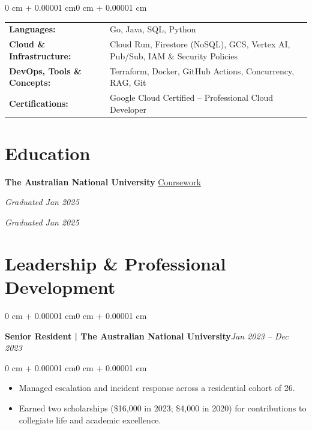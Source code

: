 \documentclass[10pt, letterpaper]{article}
\newenvironment{highlights}{
    \begin{itemize}[
        topsep=0.10 cm,
        parsep=0.10 cm,
        partopsep=0pt,
        itemsep=0pt,
        leftmargin=0 cm + 10pt
    ]
}{
    \end{itemize}
}
\newenvironment{onecolentry}{
    \begin{adjustwidth}{0 cm + 0.00001 cm}{0 cm + 0.00001 cm}
}{
    \end{adjustwidth}
}
\let\hrefWithoutArrow\href
\begin{document}
\begin{onecolentry}
    \begin{tabularx}{\linewidth}{@{} l X @{}}
        \textbf{Languages:}           & Go, Java, SQL, Python \\[0.2cm]
        \textbf{Cloud \& Infrastructure:} & Cloud Run, Firestore (NoSQL), GCS, Vertex AI, Pub/Sub, IAM \& Security Policies \\[0.2cm]
        \textbf{DevOps, Tools \& Concepts:}     & Terraform, Docker, GitHub Actions, Concurrency, RAG, Git  \\[0.2cm]
        \textbf{Certifications:}      & Google Cloud Certified – Professional Cloud Developer      \\[0.2cm]
    \end{tabularx}
\end{onecolentry}

\section{Education}
\vspace{0.1cm}

\textbf{The Australian National University}\hfill{} \hrefWithoutArrow{https://gitlab.com/llllllllleong/my-individual-works}{Coursework}%


\vspace{0.1cm}

\hspace{0.5cm}{Bachelor of Actuarial Studies}\hfill{} \textit{Graduated Jan 2025}

\vspace{0.1cm}

\hspace{0.5cm}{Bachelor of Finance (Quantitative Finance)}\hfill{} \textit{Graduated Jan 2025}

\section{Leadership \& Professional Development}
\vspace{0.1cm}

\begin{onecolentry}
    \textbf{Senior Resident | The Australian National University}\hfill \textit{Jan 2023 – Dec 2023}
\end{onecolentry}

\vspace{0.10 cm}

\begin{onecolentry}
    \begin{highlights}
        \item Managed escalation and incident response across a residential cohort of 26.
        \item Earned two scholarships (\$16,000 in 2023; \$4,000 in 2020) for contributions to collegiate life and academic excellence.
    \end{highlights}
\end{onecolentry}
\end{document}
